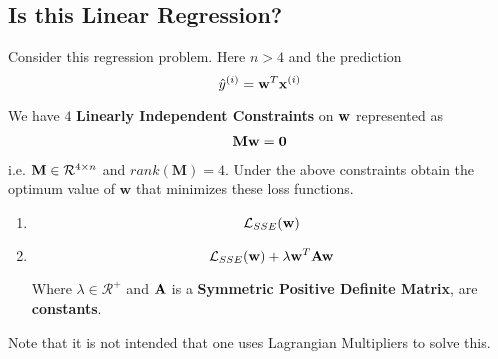 \subsection{Is this Linear Regression?}
Consider this regression problem. Here $n > 4$ and the prediction
$$\hat{y}^{(i)} = \mathbf{w}^T \mathbf{x}^{(i)}$$

We have $4$ \textbf{Linearly Independent Constraints} on $\mathbf{w}$ represented as 
\begin{align*} \label{p1_constraints}
\mathbf{M}\mathbf{w} = \mathbf{0}
\end{align*}
i.e. $\mathbf{M} \in \mathcal{R}^{4 \times n}$ and $rank(\mathbf{M}) = 4$.
Under the above constraints obtain the optimum value of $\mathbf{w}$ that minimizes these loss functions.


\begin{enumerate}[label=\alph*)]
  \item \begin{equation*}
   \mathcal{L}_{SSE}(\mathbf{w})
\end{equation*}
  \item
 \begin{equation*}
   \mathcal{L}_{SSE}(\mathbf{w}) + \lambda \mathbf{w}^T \mathbf{A} \mathbf{w}
\end{equation*}

Where $\lambda \in \mathcal{R}^{+}$ and $\mathbf{A}$ is a \textbf{Symmetric Positive Definite Matrix}, are \textbf{constants}.
\end{enumerate}

Note that it is not intended that one uses Lagrangian Multipliers to solve this. 




